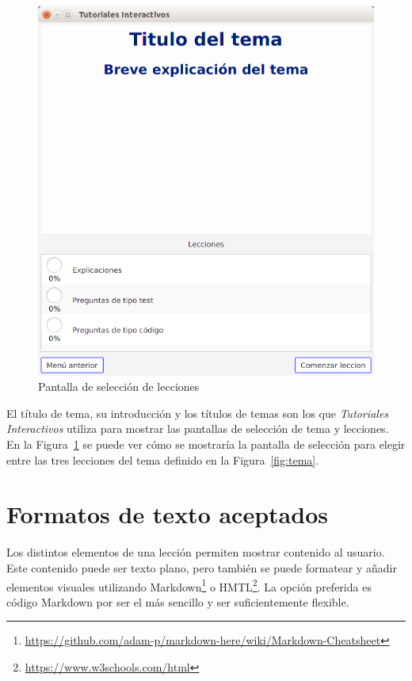 \documentclass[]{article}
\newcommand{\toolname}{\emph{Tutoriales Interactivos}}
\begin{document}
\begin{figure}[tb]
	\centerline{\includegraphics[scale=0.4]{lecciones}}
	\caption{Pantalla de selección de lecciones\label{fig:lecciones}}
\end{figure}

El título de tema, su introducción y los títulos de temas son los que \toolname{} utiliza para mostrar las pantallas de selección de tema y lecciones. En la Figura~\ref{fig:lecciones} se puede ver cómo se mostraría la pantalla de selección para elegir entre las tres lecciones del tema definido en la Figura~\ref{fig:tema}.

\section{Formatos de texto aceptados}\label{sec:texto}
Los distintos elementos de una lección permiten mostrar contenido al usuario. Este contenido puede ser texto plano, pero también se puede formatear y añadir elementos visuales utilizando Markdown\footnote{\url{https://github.com/adam-p/markdown-here/wiki/Markdown-Cheatsheet}} o HMTL\footnote{\url{https://www.w3schools.com/html}}. 
La opción preferida es código Markdown por ser el más sencillo y ser suficientemente flexible.
\end{document}
